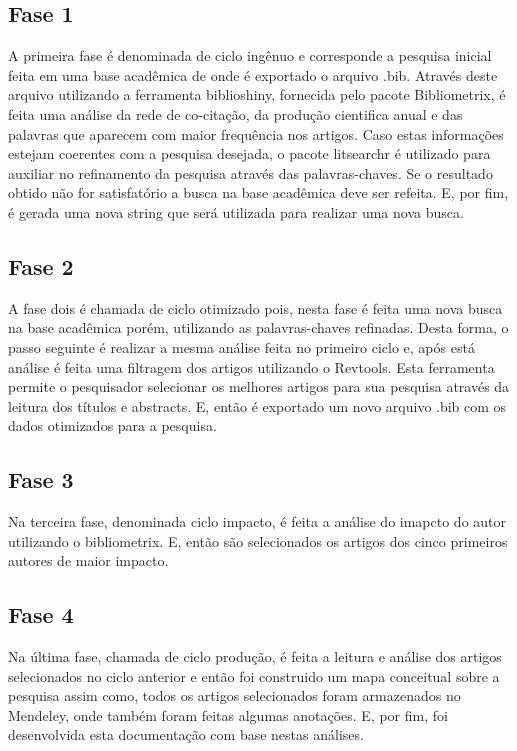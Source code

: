 \subsection{Fase 1}
\label{sec:fase1}

A primeira fase é denominada de ciclo ingênuo e corresponde a pesquisa inicial feita em uma base acadêmica  de onde é exportado o arquivo .bib. Através deste arquivo utilizando a ferramenta biblioshiny, fornecida pelo pacote Bibliometrix, é feita uma análise da rede de co-citação, da produção cientifica anual e das palavras que aparecem com maior frequência nos artigos. Caso estas informações estejam coerentes com a pesquisa desejada, o pacote litsearchr é utilizado para auxiliar no refinamento da pesquisa através das palavras-chaves. Se o resultado obtido não for satisfatório a busca na base acadêmica deve ser refeita. E, por fim, é gerada uma nova string que será utilizada para realizar uma nova busca. 


\subsection{Fase 2}
\label{sec:fase2}

A fase dois é chamada de ciclo otimizado pois, nesta fase é feita uma nova busca na base acadêmica porém, utilizando as palavras-chaves refinadas. Desta forma, o passo seguinte é realizar a mesma análise feita no primeiro ciclo e, após está análise é feita uma filtragem dos artigos utilizando o Revtools. Esta ferramenta permite o pesquisador selecionar os melhores artigos para sua pesquisa através da leitura dos títulos e abstracts. E, então é exportado um novo arquivo .bib com os dados otimizados para a pesquisa. 

\subsection{Fase 3}
\label{sec:fase3}

Na terceira fase, denominada ciclo impacto, é feita a análise do imapcto do autor utilizando o bibliometrix. E, então são selecionados os artigos dos cinco primeiros autores de maior impacto.

\subsection{Fase 4}
\label{sec:fase4}

Na última fase, chamada de ciclo produção, é feita a leitura e análise dos artigos selecionados no ciclo anterior e então foi construido um mapa conceitual sobre a pesquisa assim como, todos os artigos selecionados foram armazenados no Mendeley, onde também foram feitas algumas anotações. E, por fim, foi desenvolvida esta documentação com base nestas análises.


